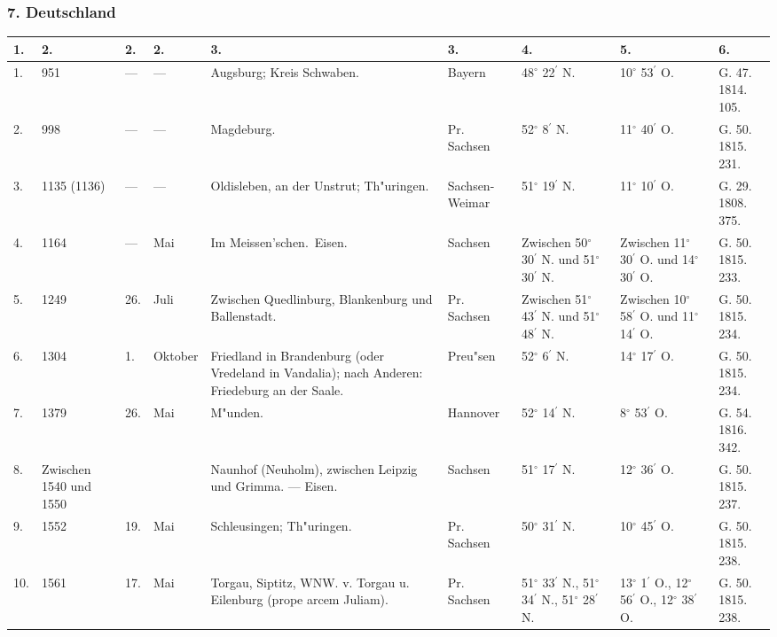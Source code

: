 \documentclass[a4paper, 8pt, oneside, polutonikogreek, german]{article}
\begin{document}
\subsubsection{7. Deutschland}
\begin{center}
    \footnotesize
    \begin{longtable}{|p{3mm}|p{10mm}|p{5mm}|p{13mm}|p{25mm}|p{13mm}|p{10mm}|p{10mm}|p{11mm}|}
    \hline
        1. & 2. & 2. & 2. & 3. & 3. & 4. & 5. & 6. \\ \hline
        1. & 951 & --- & --- & Augsburg; Kreis Schwaben. & Bayern & 48$^\circ$ 22$^\prime$ N. & 10$^\circ$ 53$^\prime$ O. & G. 47. 1814. 105. \\ \hline
        2. & 998 & --- & --- & Magdeburg. & Pr. Sachsen & 52$^\circ$ 8$^\prime$ N. & 11$^\circ$ 40$^\prime$ O. & G. 50. 1815. 231. \\ \hline
        3. & 1135 (1136) & --- & --- & Oldisleben, an der Unstrut; Th"uringen. & Sachsen-Weimar & 51$^\circ$ 19$^\prime$ N. & 11$^\circ$ 10$^\prime$ O. & G. 29. 1808. 375. \\ \hline
        4. & 1164 & --- & Mai & Im Meissen’schen. Eisen. & Sachsen & Zwischen 50$^\circ$ 30$^\prime$ N. und 51$^\circ$ 30$^\prime$ N. & Zwischen 11$^\circ$ 30$^\prime$ O. und 14$^\circ$ 30$^\prime$ O. & G. 50. 1815. 233. \\ \hline
        5. & 1249 & 26. & Juli & Zwischen Quedlinburg, Blankenburg und Ballenstadt. & Pr. Sachsen & Zwischen 51$^\circ$ 43$^\prime$ N. und 51$^\circ$ 48$^\prime$ N. & Zwischen 10$^\circ$ 58$^\prime$ O. und 11$^\circ$ 14$^\prime$ O. & G. 50. 1815. 234. \\ \hline
        6. & 1304 & 1. & Oktober & Friedland in Brandenburg (oder Vredeland in Vandalia); nach Anderen: Friedeburg an der Saale. & Preu"sen & 52$^\circ$ 6$^\prime$ N. & 14$^\circ$ 17$^\prime$ O. & G. 50. 1815. 234. \\ \hline
        7. & 1379 & 26. & Mai & M"unden. & Hannover & 52$^\circ$ 14$^\prime$ N. & 8$^\circ$ 53$^\prime$ O. & G. 54. 1816. 342. \\ \hline
        8. & Zwischen 1540 und 1550 & ~ & ~ & Naunhof (Neuholm), zwischen Leipzig und Grimma. --- Eisen. & Sachsen & 51$^\circ$ 17$^\prime$ N. & 12$^\circ$ 36$^\prime$ O. & G. 50. 1815. 237. \\ \hline
        9. & 1552 & 19. & Mai & Schleusingen; Th"uringen. & Pr. Sachsen & 50$^\circ$ 31$^\prime$ N. & 10$^\circ$ 45$^\prime$ O. & G. 50. 1815. 238. \\ \hline
        10. & 1561 & 17. & Mai & Torgau, Siptitz, WNW. v. Torgau u. Eilenburg (prope arcem Juliam). & Pr. Sachsen & 51$^\circ$ 33$^\prime$ N., 51$^\circ$ 34$^\prime$ N., 51$^\circ$ 28$^\prime$ N. & 13$^\circ$ 1$^\prime$ O., 12$^\circ$ 56$^\prime$ O., 12$^\circ$ 38$^\prime$ O. & G. 50. 1815. 238. \\ \hline

\end{longtable}
\end{center}
\end{document}
